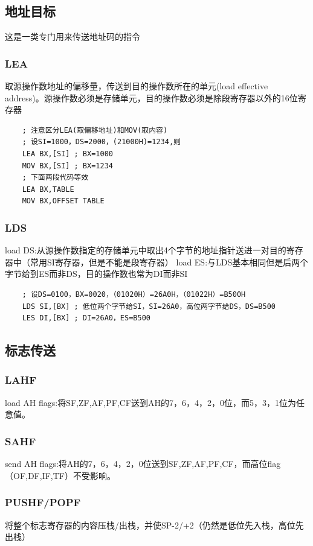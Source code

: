 \subsection{地址目标}
这是一类专门用来传送地址码的指令
\subsubsection{LEA}
取源操作数地址的偏移量，传送到目的操作数所在的单元(load effective address)。{\color{red}源操作数必须是存储单元，目的操作数必须是除段寄存器以外的16位寄存器}
\begin{lstlisting}
    ; 注意区分LEA(取偏移地址)和MOV(取内容)
    ; 设SI=1000，DS=2000，(21000H)=1234,则
    LEA BX,[SI] ; BX=1000
    MOV BX,[SI] ; BX=1234
    ; 下面两段代码等效
    LEA BX,TABLE
    MOV BX,OFFSET TABLE
\end{lstlisting}
\subsubsection{LDS}
load DS:从源操作数指定的存储单元中取出4个字节的地址指针送进一对目的寄存器中（常用SI寄存器，但是不能是段寄存器）
load ES:与LDS基本相同但是后两个字节给到ES而非DS，目的操作数也常为DI而非SI
\begin{lstlisting}
    ; 设DS=0100，BX=0020，（01020H）=26A0H，（01022H）=B500H
    LDS SI,[BX] ; 低位两个字节给SI，SI=26A0，高位两字节给DS，DS=B500
    LES DI,[BX] ; DI=26A0，ES=B500
\end{lstlisting}
\subsection{标志传送}
\subsubsection{LAHF}
load AH flags:将SF,ZF,AF,PF,CF送到AH的7，6，4，2，0位，而5，3，1位为任意值。
\subsubsection{SAHF}
send AH flags:将AH的7，6，4，2，0位送到SF,ZF,AF,PF,CF，而高位flag（OF,DF,IF,TF）不受影响。
\subsubsection{PUSHF/POPF}
将整个标志寄存器的内容压栈/出栈，并使SP-2/+2（仍然是低位先入栈，高位先出栈）
